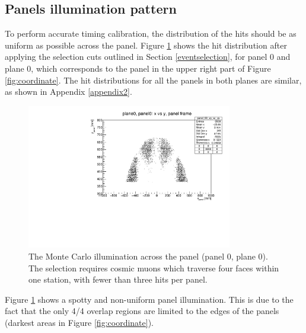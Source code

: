 \subsection{Panels illumination pattern}
To perform accurate timing calibration, 
the distribution of the hits should be 
as uniform as possible across the panel. 
Figure \ref{fig:illumination} 
shows the hit distribution after applying 
the selection cuts outlined in Section 
\ref{eventselection}, for panel 0 and plane 0, 
which corresponds to the panel in the 
upper right part of Figure \ref{fig:coordinate}. 
The hit distributions for all the panels in 
both planes are similar, as shown in Appendix \ref{appendix2}.
\begin{figure}[!h]
    \centering
    \includegraphics[width =0.8\textwidth]{figures/pdf/xp_vs_yp_panel0.pdf}
    \caption[Monte Carlo illumination across 
    the panel (panel 0, plane 0).]{
        The Monte Carlo illumination 
        across the panel (panel 0, plane 0).
        The selection requires cosmic muons which 
        traverse four faces within one station, with 
        fewer than three hits per panel.}
    \label{fig:illumination}
\end{figure}
Figure \ref{fig:illumination} shows a spotty and 
non-uniform panel illumination. This is due to the 
fact that the only 4/4 overlap regions are 
limited to the edges of the panels (darkest 
areas in Figure \ref{fig:coordinate}). 


